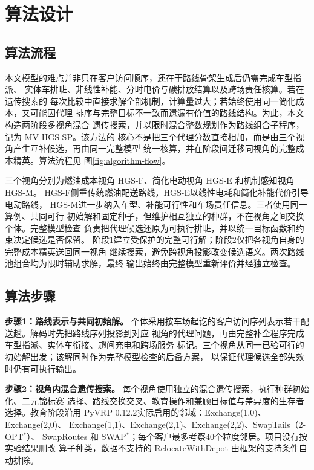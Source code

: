 \section{算法设计}

\subsection{算法流程}

本文模型的难点并非只在客户访问顺序，还在于路线骨架生成后仍需完成车型指派、
实体车排班、非线性补能、分时电价与碳排放结算以及跨场责任核算。若在遗传搜索的
每次比较中直接求解全部机制，计算量过大；若始终使用同一简化成本，又可能因代理
排序与完整目标不一致而遗漏有价值的路线结构。为此，本文构造两阶段多视角混合
遗传搜索，并以限时混合整数规划作为路线组合子程序，记为 MV-HGS-SP。该方法的
核心不是把三个代理分数直接相加，而是由三个视角产生互补候选，再由同一完整模型
统一核算，并在阶段间迁移同视角的完整成本精英。算法流程见
图\ref{fig:algorithm-flow}。

三个视角分别为燃油成本视角 HGS-F、简化电动视角 HGS-E 和机制感知视角 HGS-M。
HGS-F侧重传统燃油配送路线，HGS-E以线性电耗和简化补能代价引导电动路线，
HGS-M进一步纳入车型、补能可行性和车场责任信息。三者使用同一算例、共同可行
初始解和固定种子，但维护相互独立的种群，不在视角之间交换个体。完整模型检查
负责把代理候选还原为可执行排班，并以统一目标函数和约束决定候选是否保留。
阶段1建立受保护的完整可行解；阶段2仅把各视角自身的完整成本精英送回同一视角
继续搜索，避免跨视角投影改变候选语义。两次路线池组合均为限时辅助求解，最终
输出始终由完整模型重新评价并经独立检查。



\subsection{算法步骤}

\textbf{步骤1：路线表示与共同初始解。}
个体采用按车场起讫的客户访问序列表示若干配送趟。解码时先把路线序列投影到对应
视角的代理问题，再由完整补全程序完成车型指派、实体车衔接、趟间充电和跨场服务
标记。三个视角从同一已验可行的初始解出发；该解同时作为完整模型检查的后备方案，
以保证代理候选全部失效时仍有可执行输出。

\textbf{步骤2：视角内混合遗传搜索。}
每个视角使用独立的混合遗传搜索\cite{ref:76,ref:77}，执行种群初始化、二元锦标赛
选择、路线交换交叉、教育操作和兼顾目标值与差异度的生存者选择。教育阶段沿用
PyVRP 0.12.2\cite{ref:64}实际启用的邻域：Exchange(1,0)、Exchange(2,0)、
Exchange(1,1)、Exchange(2,1)、Exchange(2,2)、SwapTails（2-OPT$^*$）、
SwapRoutes 和 SWAP$^*$；每个客户最多考察40个粒度邻居。项目没有按实验结果删改
算子种类，数据不支持的 RelocateWithDepot 由框架的支持条件自动排除。

